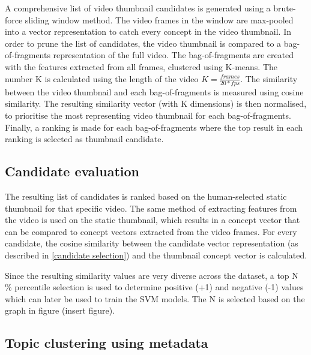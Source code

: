 \documentclass{../resources/acm_proc_article-sp}
\begin{document}
A comprehensive list of video thumbnail candidates is generated using a brute-force sliding window method. The video frames in the window are max-pooled into a vector representation to catch every concept in the video thumbnail. In order to prune the list of candidates, the video thumbnail is compared to a bag-of-fragments representation of the full video. The bag-of-fragments are created with the features extracted from all frames, clustered using K-means. The number K is calculated using the length of the video $K = \frac{frames}{20 * fps}$. The similarity between the video thumbnail and each bag-of-fragments is measured using cosine similarity. The resulting similarity vector (with K dimensions) is then normalised, to prioritise the most representing video thumbnail for each bag-of-fragments. Finally, a ranking is made for each bag-of-fragments where the top result in each ranking is selected as thumbnail candidate.

\subsection{Candidate evaluation}
\label{candidate evaluation}


The resulting list of candidates is ranked based on the human-selected static thumbnail for that specific video. The same method of extracting features from the video is used on the static thumbnail, which results in a concept vector that can be compared to concept vectors extracted from the video frames. For every candidate, the cosine similarity between the candidate vector representation (as described in \ref{candidate selection}) and the thumbnail concept vector is calculated. 

Since the resulting similarity values are very diverse across the dataset, a top N \% percentile selection is used to determine positive (+1) and negative (-1) values which can later be used to train the SVM models. The N is selected based on the graph in figure (insert figure).

\subsection{Topic clustering using metadata}
\label{topic clustering}

\end{document}
